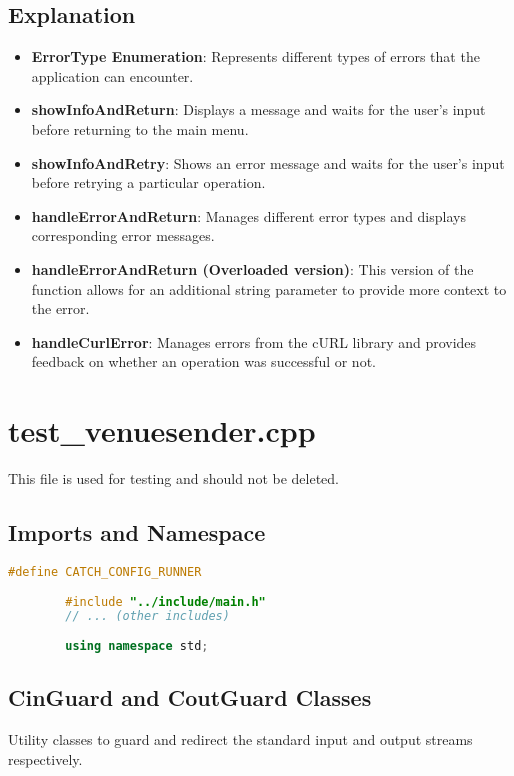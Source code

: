 \documentclass{article}
\begin{document}
	\subsection*{Explanation}
	\begin{itemize}
		\item \textbf{ErrorType Enumeration}: Represents different types of errors that the application can encounter.
		\item \textbf{showInfoAndReturn}: Displays a message and waits for the user's input before returning to the main menu.
		\item \textbf{showInfoAndRetry}: Shows an error message and waits for the user's input before retrying a particular operation.
		\item \textbf{handleErrorAndReturn}: Manages different error types and displays corresponding error messages.
		\item \textbf{handleErrorAndReturn (Overloaded version)}: This version of the function allows for an additional string parameter to provide more context to the error.
		\item \textbf{handleCurlError}: Manages errors from the cURL library and provides feedback on whether an operation was successful or not.
	\end{itemize}
	
	\section{test\_venuesender.cpp}
	
	This file is used for testing and should not be deleted.
	
	\subsection*{Imports and Namespace}
	\begin{mdframed}[backgroundcolor=background, hidealllines=false, innerleftmargin=15pt, innerrightmargin=5pt, innertopmargin=0pt, innerbottommargin=-5pt]
	\begin{lstlisting}[language=C++]
		#define CATCH_CONFIG_RUNNER
		
		#include "../include/main.h"
		// ... (other includes)
		
		using namespace std;
	\end{lstlisting}
\end{mdframed}	
	\subsection*{CinGuard and CoutGuard Classes}
	Utility classes to guard and redirect the standard input and output streams respectively.
	
\end{document}
